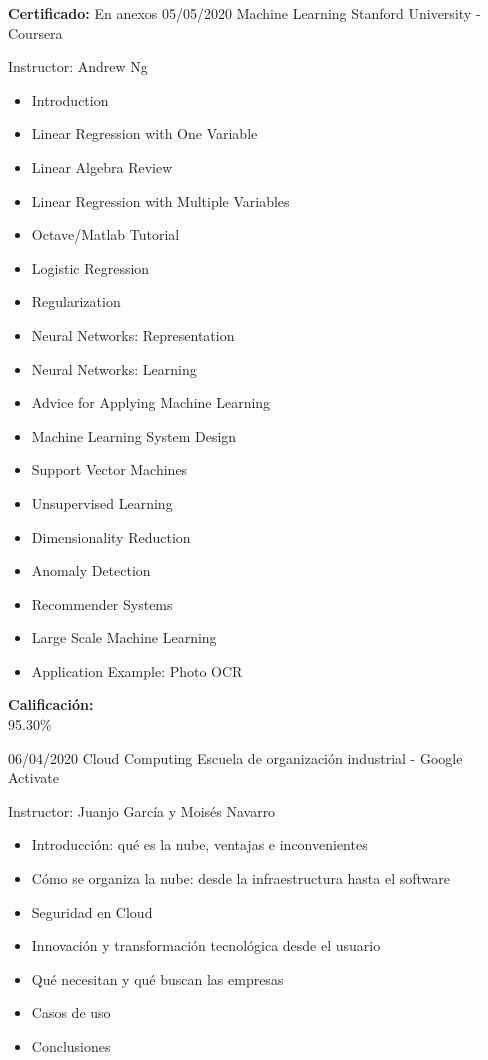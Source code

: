 \begin{entrylist}
{            \textbf{Certificado:} En anexos
		}
	\entry
		{05/05/2020}
		{Machine Learning}
		{Stanford University - Coursera}
		{
		    Instructor: Andrew Ng \\
		    \vspace{-5mm}
    	    \begin{itemize}
    	        \setlength\itemsep{0pt}
    	        \setlength\parskip{0pt}
    	        \item Introduction
    	        \item Linear Regression with One Variable
    	        \item Linear Algebra Review
    	        \item Linear Regression with Multiple Variables
    	        \item Octave/Matlab Tutorial
    	        \item Logistic Regression
    	        \item Regularization
    	        \item Neural Networks: Representation
    	        \item Neural Networks: Learning
    	        \item Advice for Applying Machine Learning
    	        \item Machine Learning System Design
    	        \item Support Vector Machines
    	        \item Unsupervised Learning
    	        \item Dimensionality Reduction
    	        \item Anomaly Detection
    	        \item Recommender Systems
    	        \item Large Scale Machine Learning
    	        \item Application Example: Photo OCR
    	    \end{itemize}
    	    \textbf{Calificación:} \\
    	    95.30\%
		}
	\entry
		{06/04/2020}
		{Cloud Computing}
		{Escuela de organización industrial - Google Activate}
		{
		    Instructor: Juanjo García y Moisés Navarro \\
		    \vspace{-5mm}
		    \begin{itemize}
		        \setlength\itemsep{0pt}
    	        \setlength\parskip{0pt}
		        \item Introducción: qué es la nube, ventajas e inconvenientes
		        \item Cómo se organiza la nube: desde la infraestructura hasta el software
		        \item Seguridad en Cloud
		        \item Innovación y transformación tecnológica desde el usuario
		        \item Qué necesitan y qué buscan las empresas
		        \item Casos de uso
		        \item Conclusiones
		    \end{itemize}
		    
}
\end{entrylist}

